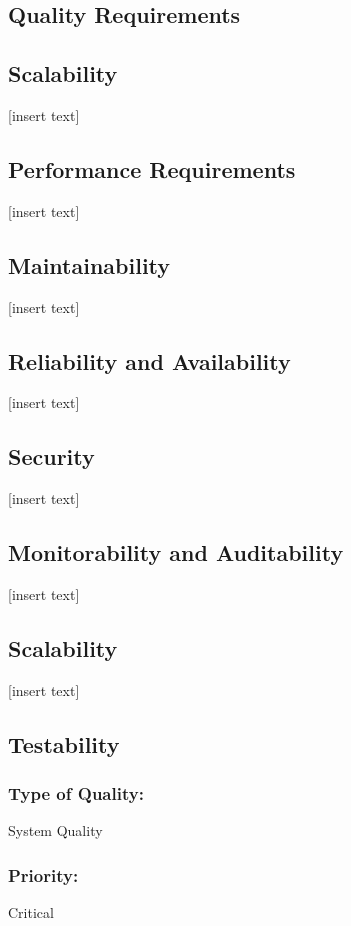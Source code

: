 \documentclass[11pt]{article}
\begin{document}
	\newpage
	\begin{center}
	\section{\textbf{\huge{Quality Requirements}}}
	\end{center}
	\subsection{Scalability}
		[insert text]
	\subsection{Performance Requirements}
		[insert text]
	\subsection{Maintainability}
		[insert text]
	\subsection{Reliability and Availability}
		[insert text]
	\subsection{Security}
		[insert text]
	\subsection{Monitorability and Auditability}
		[insert text]
	
	\subsection{Scalability}	
		[insert text]
	
	\subsection{Testability}
	
		\subsubsection{Type of Quality:}
			\textbf{} System Quality
		
		\subsubsection{Priority:}
			\textbf{} Critical
		
\end{document}
